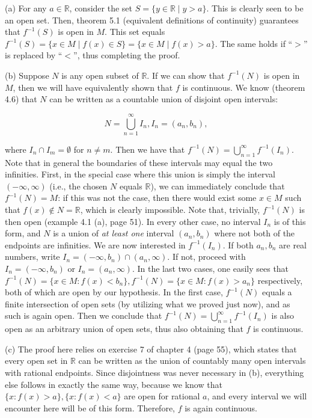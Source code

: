 \begin{solution}
    
    (a) For any $a \in \mathbb{R}$, consider the set $S = \{y \in \mathbb{R} \mid y > a\}$.
    This is clearly seen to be an open set.
    Then, theorem 5.1 (equivalent definitions of continuity) guarantees that $f^{-1}(S)$ is open in $M$.
    This set equals $f^{-1}(S) = \{x \in M \mid f(x) \in S\} = \{x \in M \mid f(x) > a\}$.
    The same holds if ``$>$'' is replaced by ``$<$'', thus completing the proof.

    (b) Suppose $N$ is any open subset of $\mathbb{R}$.
    If we can show that $f^{-1}(N)$ is open in $M$, then we will have equivalently shown that $f$ is continuous.
    We know (theorem 4.6) that $N$ can be written as a countable union of disjoint open intervals:

    \[N = \bigcup_{n=1}^{\infty} I_n, I_n = (a_n, b_n),\]

    where $I_n \cap I_m = \emptyset$ for $n \neq m$.
    Then we have that $f^{-1}(N) = \bigcup_{n=1}^{\infty} f^{-1}(I_n)$.
    Note that in general the boundaries of these intervals may equal the two infinities.    
    First, in the special case where this union is simply the interval $(-\infty, \infty)$ (i.e., the chosen $N$ equals $\mathbb{R}$), we can immediately conclude that $f^{-1}(N) = M$: if this was not the case, then there would exist some $x \in M$ such that $f(x) \notin N = \mathbb{R}$, which is clearly impossible.
    Note that, trivially, $f^{-1}(N)$ is then open (example 4.1 (a), page 51).
    In every other case, no interval $I_n$ is of this form, and $N$ is a union of \textit{at least one} interval $(a_n, b_n)$ where not both of the endpoints are infinities.
    We are now interested in $f^{-1}(I_n)$.
    If both $a_n, b_n$ are real numbers, write $I_n = (-\infty, b_n) \cap (a_n, \infty)$.
    If not, proceed with $I_n = (-\infty, b_n)$ or $I_n = (a_n, \infty)$.
    In the last two cases, one easily sees that $f^{-1}(N) = \{x \in M: f(x) < b_n\}, f^{-1}(N) = \{x \in M: f(x) > a_n\}$ respectively, both of which are open by our hypothesis.
    In the first case, $f^{-1}(N)$ equals a finite intersection of open sets (by utilizing what we proved just now), and as such is again open.
    Then we conclude that $f^{-1}(N) = \bigcup_{n=1}^{\infty} f^{-1}(I_n)$ is also open as an arbitrary union of open sets, thus also obtaining that $f$ is continuous.

    (c) The proof here relies on exercise 7 of chapter 4 (page 55), which states that every open set in $\mathbb{R}$ can be written as the union of countably many open intervals with rational endpoints.
    Since disjointness was never necessary in (b), everything else follows in exactly the same way, because we know that $\{x: f(x) > a\}, \{x: f(x) < a\}$ are open for rational $a$, and every interval we will encounter here will be of this form.
    Therefore, $f$ is again continuous.
\end{solution}

